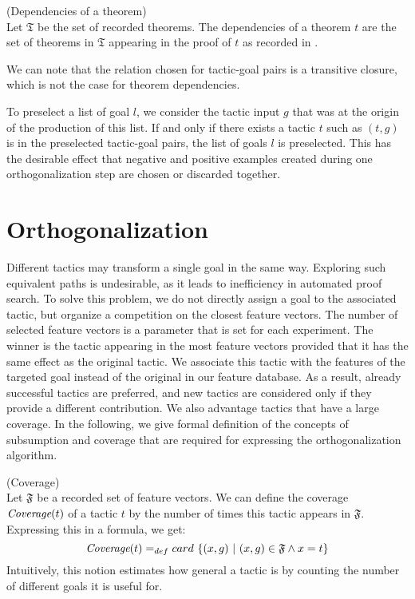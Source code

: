 \documentclass[runningheads,a4paper,draft]{svjour3}
\begin{document}
\begin{definition}(Dependencies of a theorem)\\
Let $\mathfrak{T}$ be the set of recorded theorems.
The dependencies of a theorem $t$ are the set of theorems in 
$\mathfrak{T}$ appearing in the proof of $t$ as recorded in 
\cite{hh4h4}. 
\end{definition}

\begin{remark}
We can note that the relation chosen for tactic-goal pairs is a transitive 
closure, which is not the case for theorem dependencies.
\end{remark}


To preselect a list of goal $l$, we consider the tactic input $g$ that was 
at the origin of the production of this list. If and only if there exists a 
tactic $t$ such as $(t,g)$ is in the preselected tactic-goal pairs, the 
list of goals $l$ is preselected. This has the desirable effect that
negative and positive examples created during one orthogonalization 
step are chosen or discarded together. 


\section{Orthogonalization}\label{sec:ortho}

Different tactics may transform a single goal in the same way. Exploring such 
equivalent paths
is undesirable, as it leads to inefficiency in automated proof search.
To solve this problem, we do not directly assign a goal to the associated 
tactic, but organize a competition on the closest feature vectors. The number 
of selected feature vectors is a parameter that is set for each experiment.
The winner is the tactic appearing in the most feature vectors provided that it 
has the 
same effect as the original tactic. We associate this tactic with the features 
of the targeted goal instead of the original in our feature database. As a 
result, already successful tactics are preferred, and new tactics are 
considered only if they provide a different contribution. We also advantage 
tactics that have a large coverage. In the following, we give formal definition 
of the concepts of subsumption and coverage that are required for expressing 
the orthogonalization algorithm.


\begin{definition} (Coverage)\\ 
Let $\mathfrak{F}$ be a recorded set of feature vectors. We can define the 
coverage $\textit{\mbox{Coverage}}(t)$ of a tactic $t$ by the number of times 
this tactic 
appears in 
$\mathfrak{F}$. Expressing this in a formula, we get:
  \[\textit{\mbox{Coverage}}(t) =_{def} card\ \lbrace (x,g)\ |\ (x,g) \in 
  \mathfrak{F} 
  \wedge x 
  = t
  \rbrace  \]
Intuitively, this notion estimates how general a tactic is by counting the 
number of different goals it is useful for.
\end{definition}
\end{document}
